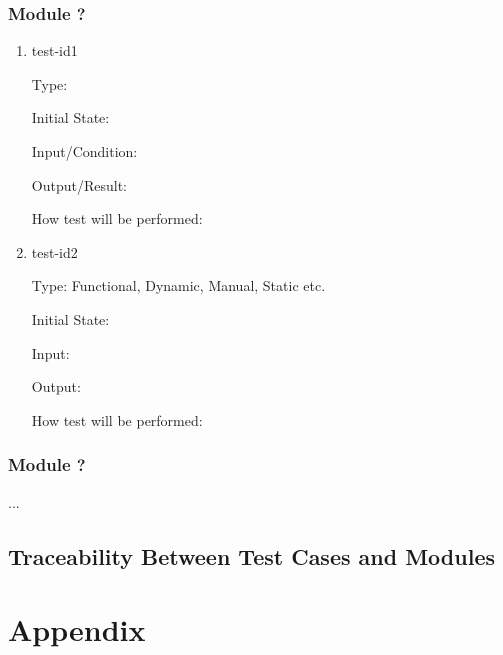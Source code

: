\documentclass[12pt, titlepage]{article}
\begin{document}

\subsubsection{Module ?}
		
\begin{enumerate}

\item{test-id1\\}

Type: 
					
Initial State: 
					
Input/Condition: 
					
Output/Result: 
					
How test will be performed: 
					
\item{test-id2\\}

Type: Functional, Dynamic, Manual, Static etc.
					
Initial State: 
					
Input: 
					
Output: 
					
How test will be performed: 

\end{enumerate}

\subsubsection{Module ?}

...

\subsection{Traceability Between Test Cases and Modules}

				




\newpage

\section{Appendix}
\end{document}
